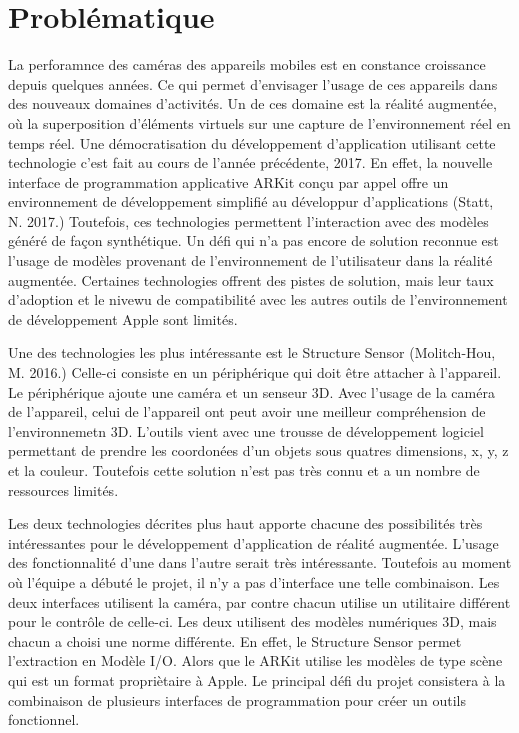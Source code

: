 \documentclass[letterpaper,twoside,12pt,french]{report}
\begin{document}
\section*{Problématique}
La perforamnce des caméras des appareils mobiles est en constance croissance depuis quelques
années. Ce qui permet d'envisager l'usage de ces appareils dans des nouveaux domaines d'activités.
Un de ces domaine est la réalité augmentée, où la superposition d'éléments virtuels sur une
capture de l'environnement réel en temps réel. Une démocratisation du développement d'application
utilisant cette technologie c'est fait au cours de l'année précédente, 2017. En effet, la nouvelle
interface de programmation applicative ARKit conçu par appel offre un environnement de
développement simplifié au développur d'applications (Statt, N. 2017.) Toutefois, ces technologies
permettent l'interaction avec des modèles généré de façon synthétique. Un défi qui n'a pas encore
de solution reconnue est l'usage de modèles provenant de l'environnement de l'utilisateur dans la
réalité augmentée. Certaines technologies offrent des pistes de solution, mais leur taux d'adoption
et le nivewu de compatibilité avec les autres outils de l'environnement de développement Apple sont
limités.
\par
Une des technologies les plus intéressante est le Structure Sensor (Molitch-Hou, M. 2016.) Celle-ci
consiste en un périphérique qui doit être attacher à l'appareil. Le périphérique ajoute une caméra
et un senseur 3D. Avec l'usage de la caméra de l'appareil, celui de l'appareil ont peut avoir une
meilleur compréhension de l'environnemetn 3D. L'outils vient avec une trousse de développement
logiciel permettant de prendre les coordonées d'un objets sous quatres dimensions, x, y, z et la
couleur. Toutefois cette solution n'est pas très connu et a un nombre de ressources limités.
\par
Les deux technologies décrites plus haut apporte chacune des possibilités très intéressantes pour
le développement d'application de réalité augmentée. L'usage des fonctionnalité d'une dans l'autre
serait très intéressante. Toutefois au moment où l'équipe a débuté le projet, il n'y a pas
d'interface une telle combinaison. Les deux interfaces utilisent la caméra, par contre chacun
utilise un utilitaire différent pour le contrôle de celle-ci. Les deux utilisent des modèles
numériques 3D, mais chacun a choisi une norme différente. En effet, le Structure Sensor permet
l'extraction en Modèle I/O. Alors que le ARKit utilise les modèles de type scène qui est un format
propriètaire à Apple. Le principal défi du projet consistera à la combinaison de plusieurs
interfaces de programmation pour créer un outils fonctionnel.
\end{document}
